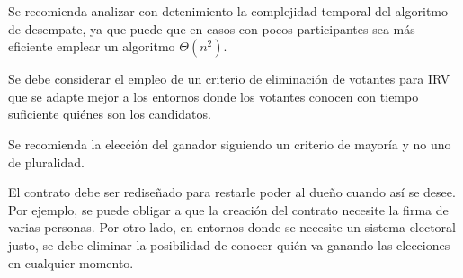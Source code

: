 \begin{recomendations}
    Se recomienda analizar con detenimiento la complejidad temporal del algoritmo de desempate, ya que puede que en casos con pocos participantes sea m\'as eficiente emplear un algoritmo $\Theta(n^2)$. 
    
    Se debe considerar el empleo de un criterio de eliminaci\'on de votantes para IRV que se adapte mejor a los entornos donde los votantes conocen con tiempo suficiente qui\'enes son los candidatos.

    Se recomienda la elecci\'on del ganador siguiendo un criterio de mayor\'ia y no uno de pluralidad. 

    El contrato debe ser redise\~nado para restarle poder al due\~no cuando as\'i se desee. Por ejemplo, se puede obligar a que la creaci\'on del contrato  necesite la firma de varias personas. Por otro lado, en  entornos donde se necesite un sistema electoral justo, se debe eliminar la posibilidad de conocer qui\'en va ganando las elecciones en cualquier momento. 
\end{recomendations}
